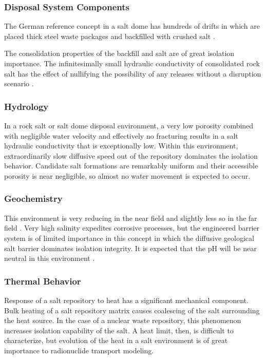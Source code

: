\subsubsection{Disposal System Components}

The German reference concept in a salt dome has hundreds of drifts in which 
are placed thick steel waste packages and backfilled with crushed salt 
\cite{von_lensa_red-impact_2008}. 

The consolidation properties of the backfill and salt are of great isolation 
importance. The infinitesimally small hydraulic conductivity of consolidated 
rock salt has the effect of nullifying the possibility of any releases without 
a disruption scenario \cite{brewitz_long-term_2002}.


\subsubsection{Hydrology}

In a rock salt or salt dome disposal environment, a very low porosity combined 
with negligible water velocity and effectively no fracturing results in a 
salt hydraulic conductivity that is exceptionally low. Within this environment,   
extraordinarily slow diffusive speed out of the repository dominates the 
isolation behavior. Candidate salt formations are remarkably uniform and their 
accessible porosity is near negligible, so almost no water movement is expected to 
occur. 

\subsubsection{Geochemistry}

This environment is very reducing in the near field and slightly less so in 
the far field \cite{clayton_generic_2011}. Very high salinity
expedites corrosive processes, but the engineered barrier system 
is of limited importance in this concept in which the diffusive geological salt barrier 
dominates isolation integrity.  It is expected that the pH will be near
neutral in this environment \cite{von_lensa_red-impact_2008, clayton_generic_2011}.

\subsubsection{Thermal Behavior}
\label{subsec:saltthermal}

Response of a salt repository to heat has a significant
mechanical component. Bulk heating of a salt repository matrix causes
coalescing  of the salt surrounding the heat source. In the case of a nuclear
waste repository, this phenomenon increases isolation capability of the salt. A
heat limit, then, is difficult to characterize, but evolution of the heat in a
salt environment is of great importance to radionuclide transport modeling. 

